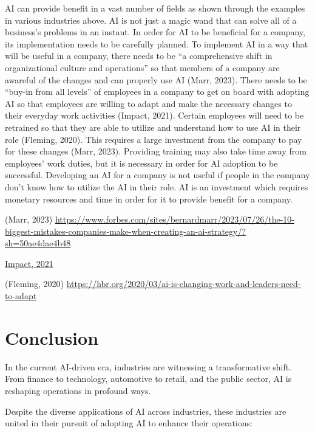 \documentclass[
]{article}
\begin{document}
AI can provide benefit in a vast number of fields as shown through the examples in various industries above. AI is not just a magic wand that can solve all of a business's problems in an instant. In order for AI to be beneficial for a company, its implementation needs to be carefully planned. To implement AI in a way that will be useful in a company, there needs to be ``a comprehensive shift in organizational culture and operations'' so that members of a company are awareful of the changes and can properly use AI (Marr, 2023). There needs to be ``buy-in from all levels'' of employees in a company to get on board with adopting AI so that employees are willing to adapt and make the necessary changes to their everyday work activities (Impact, 2021). Certain employees will need to be retrained so that they are able to utilize and understand how to use AI in their role (Fleming, 2020). This requires a large investment from the company to pay for these changes (Marr, 2023). Providing training may also take time away from employees' work duties, but it is necessary in order for AI adoption to be successful. Developing an AI for a company is not useful if people in the company don't know how to utilize the AI in their role. AI is an investment which requires monetary resources and time in order for it to provide benefit for a company.

(Marr, 2023) \url{https://www.forbes.com/sites/bernardmarr/2023/07/26/the-10-biggest-mistakes-companies-make-when-creating-an-ai-strategy/?sh=50ae4dae4b48}

\href{https://www.impactmybiz.com/blog/barriers-to-technology-adoption-in-business/}{Impact, 2021}

(Fleming, 2020)
\url{https://hbr.org/2020/03/ai-is-changing-work-and-leaders-need-to-adapt}

\hypertarget{conclusion-1}{%
\section{Conclusion}\label{conclusion-1}}

In the current AI-driven era, industries are witnessing a transformative shift. From finance to technology, automotive to retail, and the public sector, AI is reshaping operations in profound ways.

Despite the diverse applications of AI across industries, these industries are united in their pursuit of adopting AI to enhance their operations:
\end{document}
